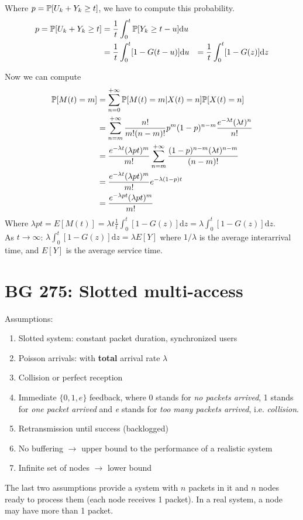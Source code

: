 Where $p = \mathbb{P}[U_k + Y_k \geq t]$, we have to compute this probability.
\begin{equation}
	\begin{split}
	 p = \mathbb{P}[U_k + Y_k \geq t] &= \frac{1}{t}\int_0^t \mathbb{P}[Y_k \geq t -u] \mathrm{d}u \\
	 &= \frac{1}{t}\int_0^t [1 - G(t-u)] \mathrm{d}u
	 &= \frac{1}{t}\int_0^t [1 - G(z)] \mathrm{d}z
	\end{split}
\end{equation}

Now we can compute
\begin{equation}
	\begin{split}
		\mathbb{P}[M(t)=m] &= \sum\limits_{n=0}^{+\infty} \mathbb{P}[M(t)=m|X(t)=n]\mathbb{P}[X(t)=n] \\
		&= \sum\limits_{n=m}^{+\infty} \frac{n!}{m!(n-m)!}p^m(1-p)^{n-m}\frac{e^{-\lambda t} (\lambda t)^n}{n!} \\
		&= \frac{e^{-\lambda t} (\lambda p t)^m}{m!}\sum\limits_{n=m}^{+\infty} \frac{(1-p)^{n-m}(\lambda t)^{n-m}}{(n-m)!}\\
		&= \frac{e^{-\lambda t} (\lambda p t)^m}{m!} e^{-\lambda(1-p)t}\\
		&= \frac{e^{-\lambda p t}(\lambda p t)^m}{m!}
	\end{split}
\end{equation}
Where $\lambda p t = E[M(t)] = \lambda t \frac{1}{t} \int_0^t [1 - G(z)] \mathrm{d}z = \lambda \int_0^t [1 - G(z)] \mathrm{d}z$. \\
As $t \rightarrow \infty$: $\lambda \int_0^t [1 - G(z)] \mathrm{d}z = \lambda E[Y]$ where $1/\lambda$ is the average interarrival time, and $E[Y]$ is the average service time.


\section{BG 275: Slotted multi-access}
Assumptions:
\begin{enumerate}
	\item Slotted system: constant packet duration, synchronized users
	\item Poisson arrivals: with \textbf{total} arrival rate $\lambda$
	\item Collision or perfect reception
	\item Immediate $ \{ 0,1, e\}$ feedback, where 0 stands for \textit{no packets arrived}, 1 stands for \textit{one packet arrived} and \textit{e} stands for \textit{too many packets arrived}, i.e. \textit{collision}.
	\item Retransmission until success (backlogged)
	\item No buffering $\rightarrow$ upper bound to the performance of a realistic system
	\item Infinite set of nodes $\rightarrow$ lower bound
\end{enumerate}
The last two assumptions provide a system with $n$ packets in it and $n$ nodes ready to process them (each node receives 1 packet).
In a real system, a node may have more than 1 packet.

